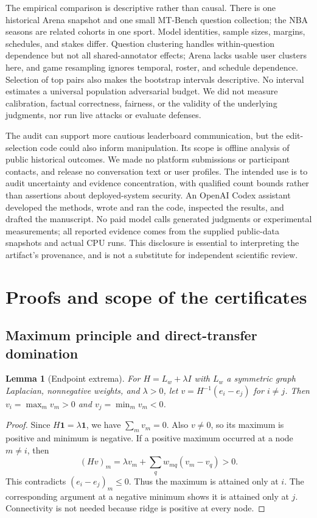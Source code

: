 \documentclass{article}
\newtheorem{lemma}{Lemma}
\begin{document}
The empirical comparison is descriptive rather than causal. There is one historical Arena snapshot and one small MT-Bench question collection; the NBA seasons are related cohorts in one sport. Model identities, sample sizes, margins, schedules, and stakes differ. Question clustering handles within-question dependence but not all shared-annotator effects; Arena lacks usable user clusters here, and game resampling ignores temporal, roster, and schedule dependence. Selection of top pairs also makes the bootstrap intervals descriptive. No interval estimates a universal population adversarial budget. We did not measure calibration, factual correctness, fairness, or the validity of the underlying judgments, nor run live attacks or evaluate defenses.

The audit can support more cautious leaderboard communication, but the edit-selection code could also inform manipulation. Its scope is offline analysis of public historical outcomes. We made no platform submissions or participant contacts, and release no conversation text or user profiles. The intended use is to audit uncertainty and evidence concentration, with qualified count bounds rather than assertions about deployed-system security. An OpenAI Codex assistant developed the methods, wrote and ran the code, inspected the results, and drafted the manuscript. No paid model calls generated judgments or experimental measurements; all reported evidence comes from the supplied public-data snapshots and actual CPU runs. This disclosure is essential to interpreting the artifact's provenance, and is not a substitute for independent scientific review.

\clearpage



\clearpage
\appendix
\section{Proofs and scope of the certificates}
\label{app:proof}
\subsection{Maximum principle and direct-transfer domination}
\begin{lemma}[Endpoint extrema]
\label{lem:maximum}
For $H=L_w+\lambda I$ with $L_w$ a symmetric graph Laplacian, nonnegative weights, and $\lambda>0$, let $v=H^{-1}(e_i-e_j)$ for $i\ne j$. Then $v_i=\max_m v_m>0$ and $v_j=\min_m v_m<0$.
\end{lemma}
\begin{proof}
Since $H\mathbf 1=\lambda\mathbf 1$, we have $\sum_m v_m=0$. Also $v\ne0$, so its maximum is positive and minimum is negative. If a positive maximum occurred at a node $m\ne i$, then
\begin{equation}
 (Hv)_m=\lambda v_m+\sum_q w_{mq}(v_m-v_q)>0.\label{eq:maxproof}
\end{equation}
This contradicts $(e_i-e_j)_m\le0$. Thus the maximum is attained only at $i$. The corresponding argument at a negative minimum shows it is attained only at $j$. Connectivity is not needed because ridge is positive at every node.
\end{proof}
\end{document}
